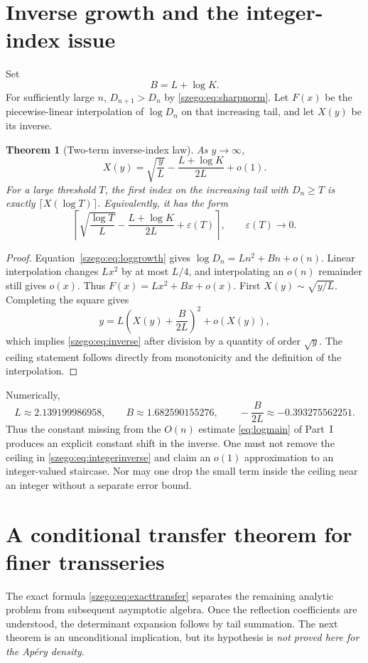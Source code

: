 \documentclass[11pt,a4paper]{article}
\numberwithin{equation}{section}
\newtheorem{theorem}{Theorem}[section]
\theoremstyle{remark}\newtheorem{remark}[theorem]{Remark}
\begin{document}
\section{Inverse growth and the integer-index issue}
\label{szego:sec:inverse}
Set
\begin{equation}\label{szego:eq:B}
 B=L+\log K.
\end{equation}
For sufficiently large $n$, $D_{n+1}>D_n$ by \eqref{szego:eq:sharpnorm}.
Let $F(x)$ be the piecewise-linear interpolation of $\log D_n$ on that
increasing tail, and let $X(y)$ be its inverse.

\begin{theorem}[Two-term inverse-index law]\label{szego:thm:inverse}
As $y\to\infty$,
\begin{equation}\label{szego:eq:inverse}
 X(y)=\sqrt{\frac yL}-\frac{L+\log K}{2L}+o(1).
\end{equation}
For a large threshold $T$, the first index on the increasing tail with
$D_n\geq T$ is exactly $\lceil X(\log T)\rceil$.
Equivalently, it has the form
\begin{equation}\label{szego:eq:integerinverse}
 \left\lceil\sqrt{\frac{\log T}{L}}-\frac{L+\log K}{2L}
              +\varepsilon(T)\right\rceil,
 \qquad \varepsilon(T)\to0.
\end{equation}
\end{theorem}
\begin{proof}
Equation~\eqref{szego:eq:loggrowth} gives
$\log D_n=Ln^2+Bn+o(n)$.
Linear interpolation changes $Lx^2$ by at most $L/4$, and interpolating
an $o(n)$ remainder still gives $o(x)$. Thus
$F(x)=Lx^2+Bx+o(x)$.
First $X(y)\sim\sqrt{y/L}$. Completing the square gives
\[
 y=L\left(X(y)+\frac B{2L}\right)^2+o(X(y)),
\]
which implies \eqref{szego:eq:inverse} after division by a quantity of order
$\sqrt y$. The ceiling statement follows directly from monotonicity and
the definition of the interpolation.
\end{proof}

Numerically,
\[
 L\approx2.139199986958,\qquad B\approx1.682590155276,
 \qquad -\frac B{2L}\approx-0.393275562251.
\]
Thus the constant missing from the $O(n)$ estimate \eqref{eq:logmain} of Part~I
produces an explicit constant shift in the inverse.
One must not remove the ceiling in \eqref{szego:eq:integerinverse} and claim an
$o(1)$ approximation to an integer-valued staircase. Nor may one drop the
small term inside the ceiling near an integer without a separate error bound.

\section{A conditional transfer theorem for finer transseries}
\label{szego:sec:transfer}
The exact formula \eqref{szego:eq:exacttransfer} separates the remaining analytic
problem from subsequent asymptotic algebra. Once the reflection coefficients
are understood, the determinant expansion follows by tail summation.
The next theorem is an unconditional implication, but its hypothesis is
\emph{not proved here for the Ap\'ery density}.
\end{document}

